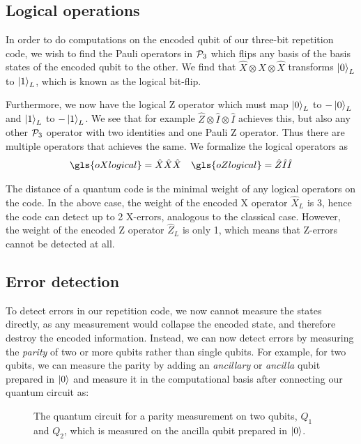 \subsection{Logical operations}

In order to do computations on the encoded qubit of our three-bit repetition code, we wish to find the Pauli operators in $\mathcal{P}_3$ which flips any basis of the basis states of the encoded qubit to the other. We find that $\hat{X}\otimes \hat{X}\otimes \hat{X}$ transforms $\ket{0}_L$ to $\ket{1}_L$, which is known as the logical bit-flip.

Furthermore, we now have the logical Z operator which must map $\ket{0}_L$ to $-\ket{0}_L$ and $\ket{1}_L$ to $-\ket{1}_L$. We see that for example $\hat{Z}\otimes \hat{I}\otimes \hat{I}$ achieves this, but also any other $\mathcal{P}_3$ operator with two identities and one Pauli Z operator. Thus there are multiple operators that achieves the same. We formalize the logical operators as
\begin{align}\label{eq:qec_3bitlogical}
  \gls{oXlogical} = \hat{X}\hat{X}\hat{X} && \gls{oZlogical} = \hat{Z}\hat{I}\hat{I}
\end{align}

The distance of a quantum code is the minimal weight of any logical operators on the code. In the above case, the weight of the encoded X operator $\hat{X}_L$ is 3, hence the code can detect up to 2 X-errors, analogous to the classical case. However, the weight of the encoded Z operator $\hat{Z}_L$ is only 1, which means that Z-errors cannot be detected at all.

\subsection{Error detection}

To detect errors in our repetition code, we now cannot measure the states directly, as any measurement would collapse the encoded state, and therefore destroy the encoded information. Instead, we can now detect errors by measuring the \emph{parity} of two or more qubits rather than single qubits. For example, for two qubits, we can measure the parity by adding an \emph{ancillary} or \emph{ancilla} qubit prepared in $\ket{0}$ and measure it in the computational basis after connecting our quantum circuit as:

\begin{figure}
  \centering
  \caption{The quantum circuit for a parity measurement on two qubits, $Q_1$ and $Q_2$, which is measured on the ancilla qubit prepared in $\ket{0}$. }\label{fig:2qubitparity}
\end{figure}

